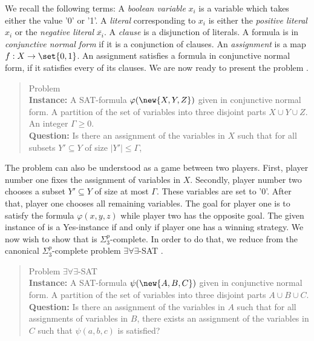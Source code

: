 \documentclass[a4paper,abstracton]{scrartcl}
\begin{document}
We recall the following terms: 
A \emph{boolean variable} $x_i$ is a variable which takes either the value '0' or '1'. 
A \emph{literal} corresponding to $x_i$ is either the \emph{positive literal} $x_i$ or the \emph{negative literal} $\overline{x_i}$. A \emph{clause} is a disjunction of literals.
 A formula is in \emph{conjunctive normal form} if it is a conjunction of clauses. 
 An \emph{assignment} is a map $f : X \rightarrow \set{0,1}$. An assignment satisfies a formula in conjunctive normal form, if it satisfies every of its clauses. 
 We are now ready to present the problem {\radj}.


\begin{quote}
Problem {\radj}
\\
\textbf{Instance:}  A SAT-formula $\varphi(\new{X,Y,Z})$ given in conjunctive normal form. A partition of the set of variables into three disjoint parts $X \cup Y \cup Z$. An integer $\Gamma \geq 0$.  
\\
\textbf{Question:} Is there an assignment  of the variables in $X$ such that for all subsets $Y' \subseteq Y$ of size $|Y'| \leq \Gamma$, 
\end{quote}

The problem {\radj} can also be understood as a game between two players. 
First, player number one fixes the assignment of variables in $X$. 
Secondly, player number two chooses a subset $Y' \subseteq Y$ of size at most $\Gamma$. 
These variables are set to '0'. 
After that, player one chooses all remaining variables. 
The goal for player one is to satisfy the formula $\varphi(x,y,z)$ while player two has the opposite goal. 
The given instance of {\radj} is a Yes-instance if and only if player one has a winning strategy. 
We now wish to show that {\radj} is $\Sigma_3^p$-complete. 
In order to do that, we reduce from the canonical $\Sigma_3^p$-complete problem $\exists\forall\exists$-SAT \cite{stockmeyer1976polynomial}.
\begin{quote}
Problem $\exists\forall\exists$-SAT
\\
\textbf{Instance:}  A SAT-formula $\psi(\new{A,B,C})$ given in conjunctive normal form. A partition of the set of variables into three disjoint parts $A \cup B \cup C$.
\\
\textbf{Question:} Is there an assignment  of the variables in $A$ such that for all assignments  of variables in $B$, there exists an assignment  of the variables in $C$ such that $\psi(a,b,c)$ is satisfied?
\end{quote}
\end{document}
